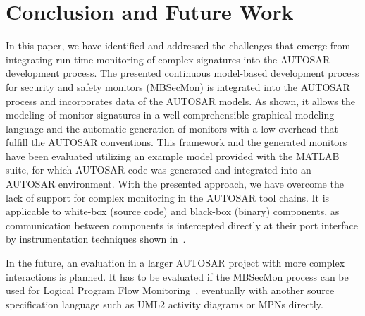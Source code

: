 \section{Conclusion and Future Work}\label{sec:conclusion}
In this paper, we have identified and addressed the challenges that emerge from integrating run-time monitoring of complex signatures into the AUTOSAR development process.
The presented continuous model-based development process for security and safety monitors (MBSecMon) is integrated into the AUTOSAR process and incorporates data of the AUTOSAR models.
As shown, it allows the modeling of monitor signatures in a well comprehensible graphical modeling language and the automatic generation of monitors with a low overhead that fulfill the AUTOSAR conventions.
This framework and the generated monitors have been evaluated utilizing an example model provided with the MATLAB suite, for which AUTOSAR code was generated and integrated into an AUTOSAR environment.
With the presented approach, we have overcome the lack of support for complex monitoring in the AUTOSAR tool chains.
It is applicable to white-box (source code) and black-box (binary) components, as communication between components is intercepted directly at their port interface by instrumentation techniques shown in~\cite{Piper2012}.

In the future, an evaluation in a larger AUTOSAR project with more complex interactions is planned.
It has to be evaluated if the MBSecMon process can be used for Logical Program Flow Monitoring~\cite{AUTOSAR_WDM_SPEC}, eventually with another source specification language such as UML2 activity diagrams or MPNs directly. 